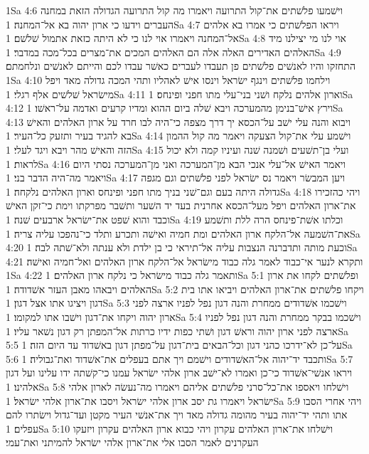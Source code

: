 1Sa 4:6  וישׁמעו פלשׁתים את־קול התרועה ויאמרו מה קול התרועה הגדולה הזאת במחנה העברים וידעו כי ארון יהוה בא אל־המחנה׃
1Sa 4:7  ויראו הפלשׁתים כי אמרו בא אלהים אל־המחנה ויאמרו אוי לנו כי לא היתה כזאת אתמול שׁלשׁם׃
1Sa 4:8  אוי לנו מי יצילנו מיד האלהים האדירים האלה אלה הם האלהים המכים את־מצרים בכל־מכה במדבר׃
1Sa 4:9  התחזקו והיו לאנשׁים פלשׁתים פן תעבדו לעברים כאשׁר עבדו לכם והייתם לאנשׁים ונלחמתם׃
1Sa 4:10  וילחמו פלשׁתים וינגף ישׂראל וינסו אישׁ לאהליו ותהי המכה גדולה מאד ויפל מישׂראל שׁלשׁים אלף רגלי׃
1Sa 4:11  וארון אלהים נלקח ושׁני בני־עלי מתו חפני ופינחס׃
1Sa 4:12  וירץ אישׁ־בנימן מהמערכה ויבא שׁלה ביום ההוא ומדיו קרעים ואדמה על־ראשׁו׃
1Sa 4:13  ויבוא והנה עלי ישׁב על־הכסא יך דרך מצפה כי־היה לבו חרד על ארון האלהים והאישׁ בא להגיד בעיר ותזעק כל־העיר׃
1Sa 4:14  וישׁמע עלי את־קול הצעקה ויאמר מה קול ההמון הזה והאישׁ מהר ויבא ויגד לעלי׃
1Sa 4:15  ועלי בן־תשׁעים ושׁמנה שׁנה ועיניו קמה ולא יכול לראות׃
1Sa 4:16  ויאמר האישׁ אל־עלי אנכי הבא מן־המערכה ואני מן־המערכה נסתי היום ויאמר מה־היה הדבר בני׃
1Sa 4:17  ויען המבשׂר ויאמר נס ישׂראל לפני פלשׁתים וגם מגפה גדולה היתה בעם וגם־שׁני בניך מתו חפני ופינחס וארון האלהים נלקחה׃
1Sa 4:18  ויהי כהזכירו את־ארון האלהים ויפל מעל־הכסא אחרנית בעד יד השׁער ותשׁבר מפרקתו וימת כי־זקן האישׁ וכבד והוא שׁפט את־ישׂראל ארבעים שׁנה׃
1Sa 4:19  וכלתו אשׁת־פינחס הרה ללת ותשׁמע את־השׁמעה אל־הלקח ארון האלהים ומת חמיה ואישׁה ותכרע ותלד כי־נהפכו עליה צריה׃
1Sa 4:20  וכעת מותה ותדברנה הנצבות עליה אל־תיראי כי בן ילדת ולא ענתה ולא־שׁתה לבה׃
1Sa 4:21  ותקרא לנער אי־כבוד לאמר גלה כבוד מישׂראל אל־הלקח ארון האלהים ואל־חמיה ואישׁה׃
1Sa 4:22  ותאמר גלה כבוד מישׂראל כי נלקח ארון האלהים׃
1Sa 5:1  ופלשׁתים לקחו את ארון האלהים ויבאהו מאבן העזר אשׁדודה׃
1Sa 5:2  ויקחו פלשׁתים את־ארון האלהים ויביאו אתו בית דגון ויציגו אתו אצל דגון׃
1Sa 5:3  וישׁכמו אשׁדודים ממחרת והנה דגון נפל לפניו ארצה לפני ארון יהוה ויקחו את־דגון וישׁבו אתו למקומו׃
1Sa 5:4  וישׁכמו בבקר ממחרת והנה דגון נפל לפניו ארצה לפני ארון יהוה וראשׁ דגון ושׁתי כפות ידיו כרתות אל־המפתן רק דגון נשׁאר עליו׃
1Sa 5:5  על־כן לא־ידרכו כהני דגון וכל־הבאים בית־דגון על־מפתן דגון באשׁדוד עד היום הזה׃
1Sa 5:6  ותכבד יד־יהוה אל־האשׁדודים וישׁמם ויך אתם בעפלים את־אשׁדוד ואת־גבוליה׃
1Sa 5:7  ויראו אנשׁי־אשׁדוד כי־כן ואמרו לא־ישׁב ארון אלהי ישׂראל עמנו כי־קשׁתה ידו עלינו ועל דגון אלהינו׃
1Sa 5:8  וישׁלחו ויאספו את־כל־סרני פלשׁתים אליהם ויאמרו מה־נעשׂה לארון אלהי ישׂראל ויאמרו גת יסב ארון אלהי ישׂראל ויסבו את־ארון אלהי ישׂראל׃
1Sa 5:9  ויהי אחרי הסבו אתו ותהי יד־יהוה בעיר מהומה גדולה מאד ויך את־אנשׁי העיר מקטן ועד־גדול וישׂתרו להם עפלים׃
1Sa 5:10  וישׁלחו את־ארון האלהים עקרון ויהי כבוא ארון האלהים עקרון ויזעקו העקרנים לאמר הסבו אלי את־ארון אלהי ישׂראל להמיתני ואת־עמי׃
